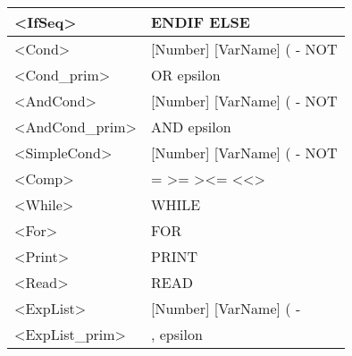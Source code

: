 \documentclass[12pt]{article}
\begin{document}
\begin{table}[H]
\begin{tabular}{|l|l|}
		\textless{}IfSeq\textgreater{}           & ENDIF ELSE                                                                      \\ \hline
		\textless{}Cond\textgreater{}            & {[}Number{]} {[}VarName{]} ( - NOT                                              \\ \hline
		\textless{}Cond\_prim\textgreater{}      & OR epsilon                                                                      \\ \hline
		\textless{}AndCond\textgreater{}         & {[}Number{]} {[}VarName{]} ( - NOT                                              \\ \hline
		\textless{}AndCond\_prim\textgreater{}   & AND epsilon                                                                     \\ \hline
		\textless{}SimpleCond\textgreater{}      & {[}Number{]} {[}VarName{]} ( - NOT                                              \\ \hline
		\textless{}Comp\textgreater{}            & = \textgreater{}= \textgreater \textless{}= \textless \textless{}\textgreater{} \\ \hline
		\textless{}While\textgreater{}           & WHILE                                                                           \\ \hline
		\textless{}For\textgreater{}             & FOR                                                                             \\ \hline
		\textless{}Print\textgreater{}           & PRINT                                                                           \\ \hline
		\textless{}Read\textgreater{}            & READ                                                                            \\ \hline
		\textless{}ExpList\textgreater{}         & {[}Number{]} {[}VarName{]} ( -                                                  \\ \hline
		\textless{}ExpList\_prim\textgreater{}   & , epsilon                                                                       \\ \hline
	\end{tabular}
\end{table}
\end{document}
